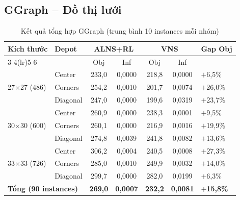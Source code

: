 \documentclass[12pt, a4paper]{article}
\begin{document}
\subsection{GGraph -- Đồ thị lưới}

\begin{table}[H]
  \centering
  \caption{Kết quả tổng hợp GGraph (trung bình 10 instances mỗi nhóm)}
  \begin{tabular}{llccccl}
    \toprule
    Kích thước & Depot &
    \multicolumn{2}{c}{ALNS+RL} &
    \multicolumn{2}{c}{VNS} &
    Gap Obj \\
    \cmidrule(lr){3-4}\cmidrule(lr){5-6}
    & & Obj & Inf & Obj & Inf & \\
    \midrule
    \multirow{3}{*}{27$\times$27 (486)} &
    Center   & 233{,}0 & 0{,}0000 & 218{,}8 & 0{,}0000 & $+$6{,}5\% \\
    & Corners  & 254{,}2 & 0{,}0010 & 201{,}7 & 0{,}0074 & $+$26{,}0\% \\
    & Diagonal & 247{,}0 & 0{,}0000 & 199{,}6 & 0{,}0319 & $+$23{,}7\% \\
    \midrule
    \multirow{3}{*}{30$\times$30 (600)} &
    Center   & 260{,}9 & 0{,}0000 & 238{,}3 & 0{,}0001 & $+$9{,}5\% \\
    & Corners  & 260{,}1 & 0{,}0000 & 216{,}9 & 0{,}0016 & $+$19{,}9\% \\
    & Diagonal & 274{,}8 & 0{,}0039 & 241{,}8 & 0{,}0082 & $+$13{,}6\% \\
    \midrule
    \multirow{3}{*}{33$\times$33 (726)} &
    Center   & 306{,}2 & 0{,}0004 & 240{,}5 & 0{,}0008 & $+$27{,}3\% \\
    & Corners  & 285{,}0 & 0{,}0010 & 249{,}9 & 0{,}0032 & $+$14{,}0\% \\
    & Diagonal & 299{,}7 & 0{,}0000 & 282{,}0 & 0{,}0199 & $+$6{,}3\% \\
    \midrule
    \multicolumn{2}{l}{\textbf{Tổng (90 instances)}} &
    \textbf{269{,}0} & \textbf{0{,}0007} & \textbf{232{,}2} & \textbf{0{,}0081} &
    \textbf{$+$15{,}8\%} \\
    \bottomrule
  \end{tabular}
\end{table}
\end{document}
